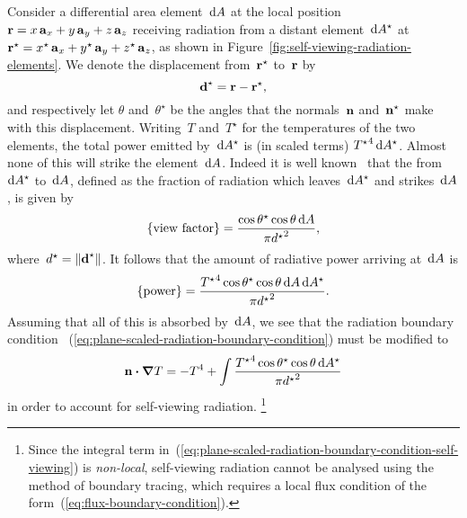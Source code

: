 Consider a differential area element~$\mathop{}\!\mathrm{d} A$ at the local position~%
$\boldsymbol{\mathbf{r}} = x \mathop{}\!\boldsymbol{\mathbf{a}}_{x} + y \mathop{}\!\boldsymbol{\mathbf{a}}_{y} + z \mathop{}\!\boldsymbol{\mathbf{a}}_{z}$
receiving radiation from a distant element~$\mathop{}\!\mathrm{d} A^\star$ at~%
$\boldsymbol{\mathbf{r}}^\star =
  x^\star \mathop{}\!\boldsymbol{\mathbf{a}}_{x} + y^\star \mathop{}\!\boldsymbol{\mathbf{a}}_{y} + z^\star \mathop{}\!\boldsymbol{\mathbf{a}}_{z}$,
as shown in Figure~\ref{fig:self-viewing-radiation-elements}.
We denote the displacement from~$\boldsymbol{\mathbf{r}}^\star$ to~$\boldsymbol{\mathbf{r}}$ by
\begin{equation}
  \boldsymbol{\mathbf{d}}^\star = \boldsymbol{\mathbf{r}} - \boldsymbol{\mathbf{r}}^\star,
  \label{eq:radiation-self-viewing-displacement}
\end{equation}
and respectively let $\theta$ and~$\theta^\star$ be the angles
that the normals~$\mathop{}\!\boldsymbol{\mathbf{n}}$ and~$\mathop{}\!\boldsymbol{\mathbf{n}}^\star$
make with this displacement.
Writing~$T$ and~$T^\star$ for the temperatures of the two elements,
the total power emitted by~$\mathop{}\!\mathrm{d} A^\star$
is (in scaled terms) ${T^\star}^4 \mathop{}\!\mathrm{d} A^\star$.
Almost none of this will strike the element~$\mathop{}\!\mathrm{d} A$.
Indeed it is well known~\cite{howell-2010-thermal-radiation-heat-transfer}
that the  from~$\mathop{}\!\mathrm{d} A^\star$ to~$\mathop{}\!\mathrm{d} A$,
defined as the fraction of radiation which leaves~$\mathop{}\!\mathrm{d} A^\star$
and strikes~$\mathop{}\!\mathrm{d} A$,
is given by
\begin{equation}
  \left\{\textnormal{view factor}\right\} =
    \frac{\cos\theta^\star \cos\theta \mathop{}\!\mathrm{d} A}{\pi {d^\star}^2},
  \label{eq:radiation-self-viewing-view-factor}
\end{equation}
where~$d^\star = \lVert\boldsymbol{\mathbf{d}}^\star\rVert$.
It follows that the amount of radiative power arriving at~$\mathop{}\!\mathrm{d} A$ is
\begin{equation}
  \left\{\textnormal{power}\right\} =
    \frac{
      {T^\star}^4 \cos\theta^\star \cos\theta \mathop{}\!\mathrm{d} A \mathop{}\!\mathrm{d} A^\star
    }{
      \pi {d^\star}^2
    }.
  \label{eq:self-viewing-power}
\end{equation}
Assuming that all of this is absorbed by~$\mathop{}\!\mathrm{d} A$,
we see that the radiation boundary condition~%
  (\ref{eq:plane-scaled-radiation-boundary-condition})
must be modified to
\begin{equation}
  \mathop{}\!\boldsymbol{\mathbf{n}} \boldsymbol{\cdot} \mathop{}\!\boldsymbol{\mathbf{\nabla}} T =
    -T^4 +
    \int
      \frac{
        {T^\star}^4 \cos\theta^\star \cos\theta \mathop{}\!\mathrm{d} A^\star
      }{
        \pi {d^\star}^2
      }
  \label{eq:plane-scaled-radiation-boundary-condition-self-viewing}
\end{equation}
in order to account for self-viewing radiation.%
\footnote{
  Since the integral term
  in~(\ref{eq:plane-scaled-radiation-boundary-condition-self-viewing})
  is \emph{non-local},
  self-viewing radiation cannot be analysed
  using the method of boundary tracing,
  which requires a local flux condition
  of the form~(\ref{eq:flux-boundary-condition}).
}
